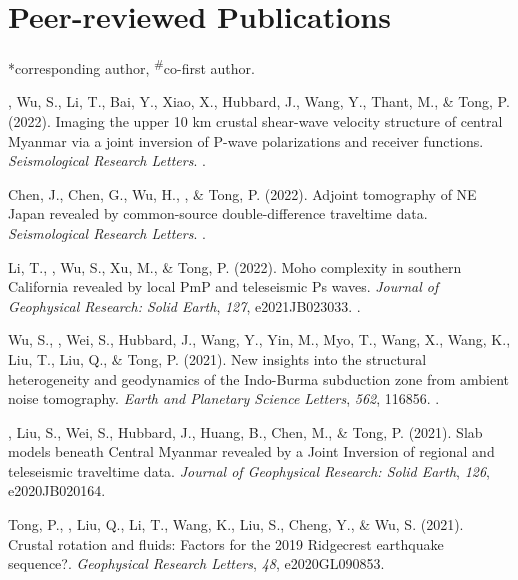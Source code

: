 \section{Peer-reviewed Publications}
\newcommand{\CS}{*} %
\newcommand{\CF}{\textsuperscript{\#}} %

\CS corresponding author, \CF co-first author.
\begin{etaremune}
\item
    \Yao, Wu, S., Li, T., Bai, Y., Xiao, X., Hubbard, J., Wang, Y., Thant, M., \& Tong, P. (2022).
    Imaging the upper 10 km crustal shear-wave velocity structure of central Myanmar via a joint inversion of P-wave polarizations and receiver functions.
    \textit{Seismological Research Letters}.
	.
\item
    Chen, J., Chen, G., Wu, H., \Yao, \& Tong, P. (2022).
    Adjoint tomography of NE Japan revealed by common-source double-difference traveltime data.
    \textit{Seismological Research Letters}.
    .
\item
    Li, T., \Yao, Wu, S., Xu, M., \& Tong, P. (2022).
    Moho complexity in southern California revealed by local PmP and teleseismic Ps waves.
    \textit{Journal of Geophysical Research: Solid Earth}, \textit{127}, e2021JB023033.
    .
\item
    Wu, S., \Yao, Wei, S., Hubbard, J., Wang, Y., Yin, M., Myo, T., Wang, X., Wang, K., Liu, T., Liu, Q., \& Tong, P. (2021).
    New insights into the structural heterogeneity and geodynamics of the Indo-Burma subduction zone from ambient noise tomography.
    \textit{Earth and Planetary Science Letters}, \textit{562}, 116856.
    .
\item
    \Yao, Liu, S., Wei, S., Hubbard, J., Huang, B., Chen, M., \& Tong, P. (2021).
    Slab models beneath Central Myanmar revealed by a Joint Inversion of regional and teleseismic traveltime data.
    \textit{Journal of Geophysical Research: Solid Earth}, \textit{126}, e2020JB020164.
\item
    Tong, P., \Yao, Liu, Q., Li, T., Wang, K., Liu, S., Cheng, Y., \& Wu, S. (2021).
    Crustal rotation and fluids: Factors for the 2019 Ridgecrest earthquake sequence?.
    \textit{Geophysical Research Letters}, \textit{48}, e2020GL090853.
\item

\end{etaremune}
